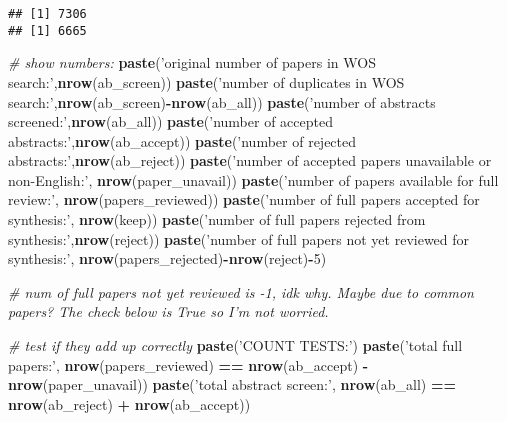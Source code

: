 \documentclass[
]{article}
\newenvironment{Shaded}{\begin{snugshade}}{\end{snugshade}}
\newcommand{\CommentTok}[1]{\textcolor[rgb]{0.56,0.35,0.01}{\textit{#1}}}
\newcommand{\DecValTok}[1]{\textcolor[rgb]{0.00,0.00,0.81}{#1}}
\newcommand{\KeywordTok}[1]{\textcolor[rgb]{0.13,0.29,0.53}{\textbf{#1}}}
\newcommand{\NormalTok}[1]{#1}
\newcommand{\OperatorTok}[1]{\textcolor[rgb]{0.81,0.36,0.00}{\textbf{#1}}}
\newcommand{\StringTok}[1]{\textcolor[rgb]{0.31,0.60,0.02}{#1}}
\begin{document}
\begin{verbatim}
## [1] 7306
## [1] 6665
\end{verbatim}

\begin{Shaded}
\begin{Highlighting}[]
\CommentTok{# show numbers:}
  \KeywordTok{paste}\NormalTok{(}\StringTok{'original number of papers in WOS search:'}\NormalTok{,}\KeywordTok{nrow}\NormalTok{(ab_screen))}
  \KeywordTok{paste}\NormalTok{(}\StringTok{'number of duplicates in WOS search:'}\NormalTok{,}\KeywordTok{nrow}\NormalTok{(ab_screen)}\OperatorTok{-}\KeywordTok{nrow}\NormalTok{(ab_all))}
  \KeywordTok{paste}\NormalTok{(}\StringTok{'number of abstracts screened:'}\NormalTok{,}\KeywordTok{nrow}\NormalTok{(ab_all))}
  \KeywordTok{paste}\NormalTok{(}\StringTok{'number of accepted abstracts:'}\NormalTok{,}\KeywordTok{nrow}\NormalTok{(ab_accept))}
  \KeywordTok{paste}\NormalTok{(}\StringTok{'number of rejected abstracts:'}\NormalTok{,}\KeywordTok{nrow}\NormalTok{(ab_reject))}
  \KeywordTok{paste}\NormalTok{(}\StringTok{'number of accepted papers unavailable or non-English:'}\NormalTok{,}
        \KeywordTok{nrow}\NormalTok{(paper_unavail))}
  \KeywordTok{paste}\NormalTok{(}\StringTok{'number of papers available for full review:'}\NormalTok{,}
        \KeywordTok{nrow}\NormalTok{(papers_reviewed))}
  \KeywordTok{paste}\NormalTok{(}\StringTok{'number of full papers accepted for synthesis:'}\NormalTok{,}
        \KeywordTok{nrow}\NormalTok{(keep)) }
  \KeywordTok{paste}\NormalTok{(}\StringTok{'number of full papers rejected from synthesis:'}\NormalTok{,}\KeywordTok{nrow}\NormalTok{(reject))}
  \KeywordTok{paste}\NormalTok{(}\StringTok{'number of full papers not yet reviewed for synthesis:'}\NormalTok{,}
        \KeywordTok{nrow}\NormalTok{(papers_rejected)}\OperatorTok{-}\KeywordTok{nrow}\NormalTok{(reject)}\OperatorTok{-}\DecValTok{5}\NormalTok{)}
  
\CommentTok{# num of full papers not yet reviewed is -1, idk why. Maybe due to common papers? The check below is True so I'm not worried.    }
  
  
\CommentTok{# test if they add up correctly}
  \KeywordTok{paste}\NormalTok{(}\StringTok{'COUNT TESTS:'}\NormalTok{)}
  \KeywordTok{paste}\NormalTok{(}\StringTok{'total full papers:'}\NormalTok{,}
        \KeywordTok{nrow}\NormalTok{(papers_reviewed) }\OperatorTok{==}\StringTok{ }\KeywordTok{nrow}\NormalTok{(ab_accept) }\OperatorTok{-}\StringTok{ }\KeywordTok{nrow}\NormalTok{(paper_unavail))}
  \KeywordTok{paste}\NormalTok{(}\StringTok{'total abstract screen:'}\NormalTok{,}
        \KeywordTok{nrow}\NormalTok{(ab_all) }\OperatorTok{==}\StringTok{ }\KeywordTok{nrow}\NormalTok{(ab_reject) }\OperatorTok{+}\StringTok{ }\KeywordTok{nrow}\NormalTok{(ab_accept))}
\end{Highlighting}
\end{Shaded}
\end{document}
